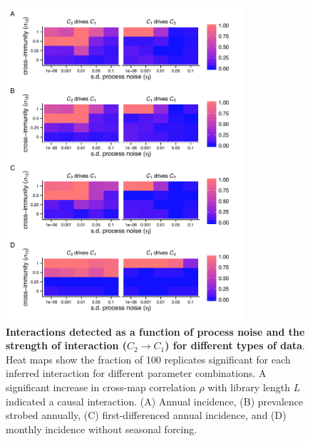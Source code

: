 \documentclass[10pt]{article}
\begin{document}
\begin{figure}
\begin{center}
  \includegraphics[width=3.5in]{dataflow/out/fig_detect_diffdata/fig_detect_diffdata.pdf}
  \end{center}
  \caption{\textbf{Interactions detected as a function of process noise and the strength of interaction ($C_2 \rightarrow C_1$) for different types of data}. Heat maps show the fraction of 100 replicates significant for each inferred interaction for different parameter combinations. A significant increase in cross-map correlation $\rho$ with library length $L$ indicated a causal interaction. (A) Annual incidence, (B) prevalence strobed annually, (C) first-differenced annual incidence, and (D) monthly incidence without seasonal forcing.  \label{fig:crap_heatmaps_tmp}}
\end{figure}
\end{document}
